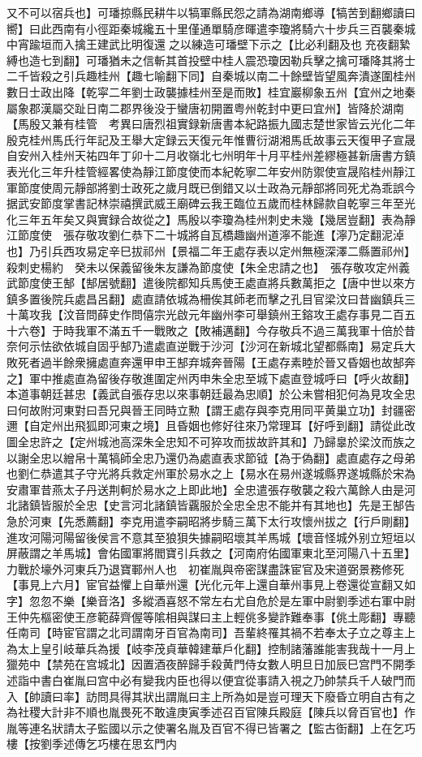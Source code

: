 又不可以宿兵也】可璠掠縣民耕牛以犒軍縣民怨之請為湖南鄉導【犒苦到翻鄉讀曰嚮】曰此西南有小徑距秦城纔五十里僅通單騎彦暉遣李瓊將騎六十步兵三百襲秦城中宵踰垣而入擒王建武比明復還之以練造可璠壁下示之【比必利翻及也充夜翻縶縛也造七到翻】可璠猶未之信斬其首投壁中桂人震恐瓊因勒兵擊之擒可璠降其將士二千皆殺之引兵趣桂州【趣七喻翻下同】自秦城以南二十餘壁皆望風奔潰遂圍桂州數日士政出降【乾寜二年劉士政襲據桂州至是而敗】桂宜巖柳象五州【宜州之地秦屬象郡漢屬交趾日南二郡界後没于蠻唐初開置粤州乾封中更曰宜州】皆降於湖南【馬殷又兼有桂管　考異曰唐烈祖實録新唐書本紀路振九國志楚世家皆云光化二年殷克桂州馬氏行年記及王舉大定録云天復元年惟曹衍湖湘馬氐故事云天復甲子宣晟自安州入桂州天祐四年丁卯十二月收嶺北七州明年十月平桂州差繆極甚新唐書方鎮表光化三年升桂管經畧使為靜江節度使而本紀乾寧二年安州防禦使宣晟陷桂州靜江軍節度使周元靜部將劉士政死之歲月既已倒錯又以士政為元靜部將同死尤為乖誤今据武安節度掌書記林崇禧撰武威王廟碑云我王臨位五歲而桂林歸款自乾寧三年至光化三年五年矣又與實録合故從之】馬殷以李瓊為桂州刺史未幾【幾居豈翻】表為靜江節度使　張存敬攻劉仁恭下二十城將自瓦橋趣幽州道濘不能進【濘乃定翻泥淖也】乃引兵西攻易定辛巳拔祁州【景福二年王處存表以定州無極深澤二縣置祁州】殺刺史楊約　癸未以保義留後朱友謙為節度使【朱全忠請之也】　張存敬攻定州義武節度使王郜【郜居號翻】遣後院都知兵馬使王處直將兵數萬拒之【唐中世以來方鎮多置後院兵處昌呂翻】處直請依城為柵俟其師老而擊之孔目官梁汶曰昔幽鎮兵三十萬攻我【汶音問薛史作問僖宗光啟元年幽州李可舉鎮州王鎔攻王處存事見二百五十六卷】于時我軍不滿五千一戰敗之【敗補邁翻】今存敬兵不過三萬我軍十倍於昔奈何示怯欲依城自固乎郜乃遣處直逆戰于沙河【沙河在新城北望都縣南】易定兵大敗死者過半餘衆擁處直奔還甲申王郜弃城奔晉陽【王處存素睦於晉又昏姻也故郜奔之】軍中推處直為留後存敬進圍定州丙申朱全忠至城下處直登城呼曰【呼火故翻】本道事朝廷甚忠【義武自張存忠以來事朝廷最為忠順】於公未嘗相犯何為見攻全忠曰何故附河東對曰吾兄與晉王同時立勲【謂王處存與李克用同平黄巢立功】封疆密邇【自定州出飛狐即河東之境】且昏姻也修好往來乃常理耳【好呼到翻】請從此改圖全忠許之【定州城池高深朱全忠知不可猝攻而拔故許其和】乃歸辠於梁汶而族之以謝全忠以繒帛十萬犒師全忠乃還仍為處直表求節钺【為于偽翻】處直處存之母弟也劉仁恭遣其子守光將兵救定州軍於易水之上【易水在易州遂城縣界遂城縣於宋為安肅軍昔燕太子丹送荆軻於易水之上即此地】全忠遣張存敬襲之殺六萬餘人由是河北諸鎮皆服於全忠【史言河北諸鎮皆覊服於全忠全忠不能并有其地也】先是王郜告急於河東【先悉薦翻】李克用遣李嗣昭將步騎三萬下太行攻懷州拔之【行戶剛翻】進攻河陽河陽留後侯言不意其至狼狽失據嗣昭壞其羊馬城【壞音怪城外别立短垣以屏蔽謂之羊馬城】會佑國軍將閻寶引兵救之【河南府佑國軍東北至河陽八十五里】力戰於壕外河東兵乃退寶鄆州人也　初崔胤與帝密謀盡誅宦官及宋道弼景務修死【事見上六月】宦官益懼上自華州還【光化元年上還自華州事見上卷還從宣翻又如字】忽忽不樂【樂音洛】多縱酒喜怒不常左右尤自危於是左軍中尉劉季述右軍中尉王仲先樞密使王彦範薛齊偓等隂相與謀曰主上輕佻多變詐難奉事【佻土彫翻】專聽任南司【時宦官謂之北司謂南牙百官為南司】吾輩終罹其禍不若奉太子立之尊主上為太上皇引岐華兵為援【岐李茂貞華韓建華戶化翻】控制諸藩誰能害我哉十一月上獵苑中【禁苑在宫城北】因置酒夜醉歸手殺黄門侍女數人明旦日加辰巳宫門不開季述詣中書白崔胤曰宫中必有變我内臣也得以便宜從事請入視之乃帥禁兵千人破門而入【帥讀曰率】訪問具得其狀出謂胤曰主上所為如是豈可理天下廢昏立明自古有之為社稷大計非不順也胤畏死不敢違庚寅季述召百官陳兵殿庭【陳兵以脅百官也】作胤等連名狀請太子監國以示之使署名胤及百官不得已皆署之【監古衘翻】上在乞巧樓【按劉季述傳乞巧樓在思玄門内